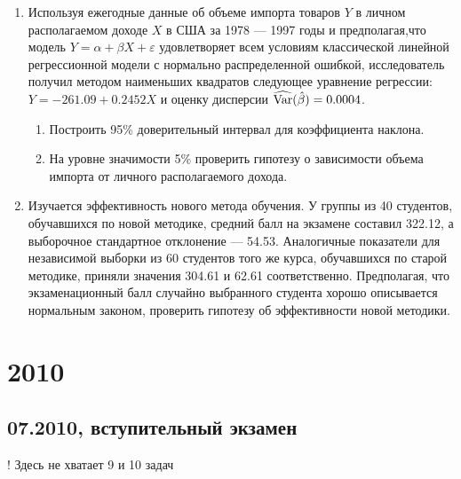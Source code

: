 \documentclass[pdftex,12pt,a4paper]{article}
\begin{document}
\begin{enumerate}
\item Используя ежегодные данные об объеме импорта товаров $Y$ в личном располагаемом доходе $X$ в США за 1978 --- 1997 годы и предполагая,что модель $Y=\alpha+\beta X+\varepsilon$ удовлетворяет всем условиям классической линейной регрессионной модели с нормально распределенной ошибкой, исследователь получил методом наименьших квадратов следующее уравнение регрессии: $Y=-261.09+0.2452X$ и оценку дисперсии $\widehat{\operatorname{Var}}(\hat{\beta})=0.0004$. 
\begin{enumerate}
\item Построить 95\% доверительный интервал для коэффициента наклона.
\item На уровне значимости 5\% проверить гипотезу о зависимости объема импорта от личного располагаемого дохода.
\end{enumerate}
\item Изучается эффективность нового метода обучения. У группы из 40 студентов, обучавшихся по новой методике, средний балл на экзамене составил 322.12, а выборочное стандартное отклонение --- 54.53. Аналогичные показатели для независимой выборки из 60 студентов того же курса, обучавшихся по старой методике, приняли значения 304.61 и 62.61 соответственно. Предполагая, что экзаменационный балл случайно выбранного студента хорошо описывается нормальным законом, проверить гипотезу об эффективности новой методики.
\end{enumerate} 


\section{2010}
\subsection{07.2010, вступительный экзамен}

! Здесь не хватает 9 и 10 задач
\end{document}
